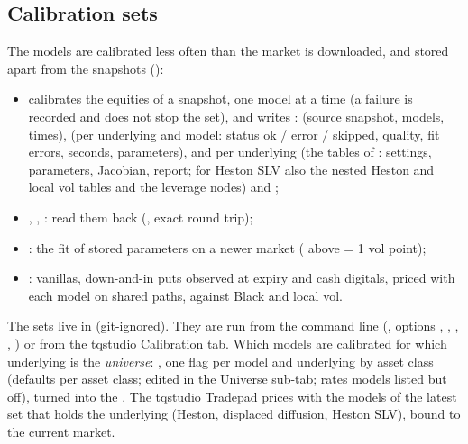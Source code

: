 \subsection{Calibration sets}\label{sec:arch-calibration-sets}
The models are calibrated less often than the market is downloaded, and stored apart from the snapshots
():
\begin{itemize}[nosep]
  \item {} calibrates the equities of a snapshot, one model
        at a time (a failure is recorded and does not stop the set), and writes
        :  (source snapshot, models, times),
         (per underlying and model: status ok / error / skipped, quality, fit errors, seconds,
        parameters), and per underlying  (the tables of : settings,
        parameters, Jacobian, report; for Heston SLV also the nested Heston and local vol tables and the leverage
        nodes) and ;
  \item {}, , : read
        them back (, exact round trip);
  \item {}: the fit of stored parameters on a newer market ( above
         = 1 vol point);
  \item {}: vanillas, down-and-in puts observed at expiry and cash digitals,
        priced with each model on shared paths, against Black and local vol.
\end{itemize}
The sets live in  (git-ignored). They are run from the command line
(, options , , , ,
) or from the tqstudio Calibration tab. Which models are calibrated for which underlying is the
\emph{universe}: , one flag per model and underlying by asset class
(defaults per asset class; edited in the Universe sub-tab; rates models listed but off), turned into the
 . The tqstudio Tradepad prices with the models of the latest set that holds the
underlying (Heston, displaced diffusion, Heston SLV), bound to the current market.

